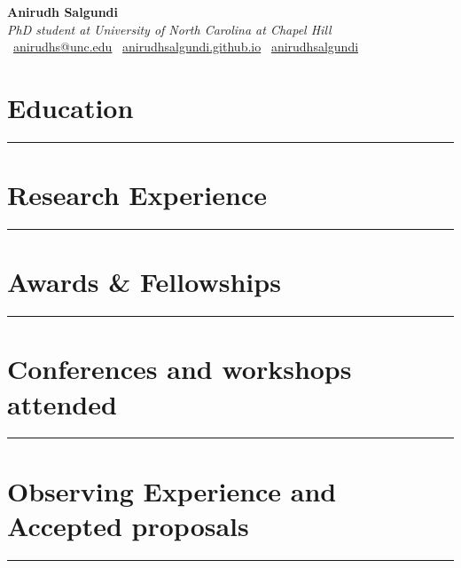 \documentclass[12pt]{article}
\newcommand{\mytitle}[5]{%
  \begin{center}
    {\Huge\textbf{#1}}\\[0.5em]
    \textit{#2} \\[0.5em]
    \faEnvelope\ \href{mailto:#3}{#3} \quad
    \faGlobe\ \href{https://#4}{#4} \quad
    \faGithub\ \href{https://github.com/#5}{#5}
  \end{center}
}
\begin{document}

\mytitle{Anirudh Salgundi}{PhD student at University of North Carolina at Chapel Hill}{anirudhs@unc.edu}{anirudhsalgundi.github.io}{anirudhsalgundi}
\RaggedRight

\section*{Education}
\vspace{-0.5em}
\noindent\rule{\textwidth}{0.4pt}


\vspace{0.7em}

\section*{Research Experience}
\vspace{-0.5em}
\noindent\rule{\textwidth}{0.4pt}


\vspace{0.7em}

\section*{Awards \& Fellowships}
\vspace{-0.5em}
\noindent\rule{\textwidth}{0.4pt}


\vspace{0.7em}

\section*{Conferences and workshops attended}
\vspace{-0.5em}
\noindent\rule{\textwidth}{0.4pt}


\vspace{0.7em}

\section*{Observing Experience and Accepted proposals}
\vspace{-0.5em}
\noindent\rule{\textwidth}{0.4pt}

\end{document}
